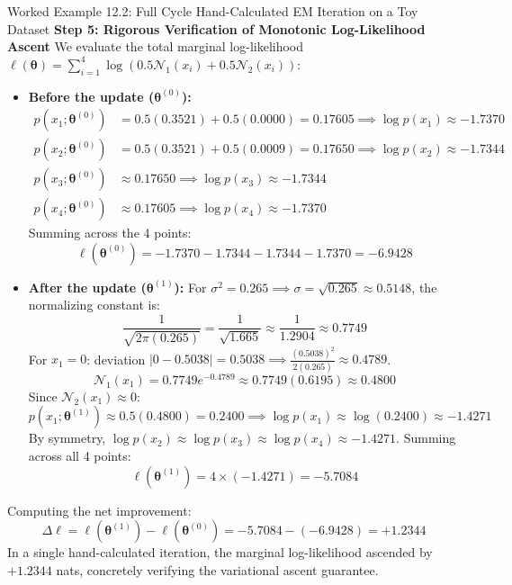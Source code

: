 \begin{examplebox}[breakable]{Worked Example 12.2: Full Cycle Hand-Calculated EM Iteration on a Toy Dataset}
\textbf{Step 5: Rigorous Verification of Monotonic Log-Likelihood Ascent}
We evaluate the total marginal log-likelihood $\ell(\boldsymbol{\theta}) = \sum_{i=1}^4 \log\left( 0.5 \mathcal{N}_1(x_i) + 0.5 \mathcal{N}_2(x_i) \right)$:
\begin{itemize}
    \item \textbf{Before the update ($\boldsymbol{\theta}^{(0)}$):}
    \begin{align}
    p(x_1; \boldsymbol{\theta}^{(0)}) &= 0.5(0.3521) + 0.5(0.0000) = 0.17605 \implies \log p(x_1) \approx -1.7370 \\
    p(x_2; \boldsymbol{\theta}^{(0)}) &= 0.5(0.3521) + 0.5(0.0009) = 0.17650 \implies \log p(x_2) \approx -1.7344 \\
    p(x_3; \boldsymbol{\theta}^{(0)}) &\approx 0.17650 \implies \log p(x_3) \approx -1.7344 \\
    p(x_4; \boldsymbol{\theta}^{(0)}) &\approx 0.17605 \implies \log p(x_4) \approx -1.7370
    \end{align}
    Summing across the 4 points:
    \begin{equation}
    \ell(\boldsymbol{\theta}^{(0)}) = -1.7370 - 1.7344 - 1.7344 - 1.7370 = \mathbf{-6.9428}
    \end{equation}

    \item \textbf{After the update ($\boldsymbol{\theta}^{(1)}$):}
    For $\sigma^2 = 0.265 \implies \sigma = \sqrt{0.265} \approx 0.5148$, the normalizing constant is:
    \begin{equation}
    \frac{1}{\sqrt{2\pi(0.265)}} = \frac{1}{\sqrt{1.665}} \approx \frac{1}{1.2904} \approx 0.7749
    \end{equation}
    For $x_1 = 0$: deviation $|0 - 0.5038| = 0.5038 \implies \frac{(0.5038)^2}{2(0.265)} \approx 0.4789$.
    \begin{equation}
    \mathcal{N}_1(x_1) = 0.7749 e^{-0.4789} \approx 0.7749(0.6195) \approx 0.4800
    \end{equation}
    Since $\mathcal{N}_2(x_1) \approx 0$:
    \begin{equation}
    p(x_1; \boldsymbol{\theta}^{(1)}) \approx 0.5(0.4800) = 0.2400 \implies \log p(x_1) \approx \log(0.2400) \approx -1.4271
    \end{equation}
    By symmetry, $\log p(x_2) \approx \log p(x_3) \approx \log p(x_4) \approx -1.4271$.
    Summing across all 4 points:
    \begin{equation}
    \ell(\boldsymbol{\theta}^{(1)}) = 4 \times (-1.4271) = \mathbf{-5.7084}
    \end{equation}
\end{itemize}
Computing the net improvement:
\begin{equation}
\Delta \ell = \ell(\boldsymbol{\theta}^{(1)}) - \ell(\boldsymbol{\theta}^{(0)}) = -5.7084 - (-6.9428) = \mathbf{+1.2344}
\end{equation}
In a single hand-calculated iteration, the marginal log-likelihood ascended by $\mathbf{+1.2344}$ nats, concretely verifying the variational ascent guarantee.
\end{examplebox}

